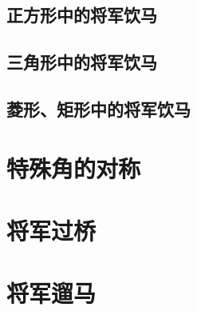 \documentclass[10pt]{ctexart}
\begin{document}
\subsection{正方形中的将军饮马}
\subsection{三角形中的将军饮马}
\subsection{菱形、矩形中的将军饮马}

\section{特殊角的对称}
\section{将军过桥}
\section{将军遛马}
\end{document}
